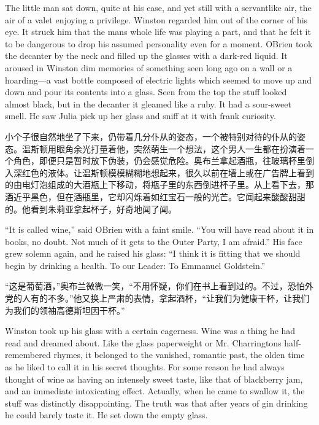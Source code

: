 \begin{paracol}{2}
\switchcolumn*

The little man sat down, quite at his ease, and yet still with a
servantlike air, the air of a valet enjoying a privilege. Winston
regarded him out of the corner of his eye. It struck him that the
man\textquotesingle s whole life was playing a part, and that he felt it
to be dangerous to drop his assumed personality even for a moment.
O\textquotesingle Brien took the decanter by the neck and filled up the
glasses with a dark-red liquid. It aroused in Winston dim memories of
something seen long ago on a wall or a hoarding---a vast bottle composed
of electric lights which seemed to move up and down and pour its
contents into a glass. Seen from the top the stuff looked almost black,
but in the decanter it gleamed like a ruby. It had a sour-sweet smell.
He saw Julia pick up her glass and sniff at it with frank curiosity.

\switchcolumn

小个子很自然地坐了下来，仍带着几分仆从的姿态，一个被特别对待的仆从的姿态。温斯顿用眼角余光打量着他，突然萌生一个想法，这个男人一生都在扮演着一个角色，即便只是暂时放下伪装，仍会感觉危险。奥布兰拿起酒瓶，往玻璃杯里倒入深红色的液体。让温斯顿模模糊糊地想起来，很久以前在墙上或在广告牌上看到的由电灯泡组成的大酒瓶上下移动，将瓶子里的东西倒进杯子里。从上看下去，那酒近乎黑色，但在酒瓶里，它却闪烁着如红宝石一般的光芒。它闻起来酸酸甜甜的。他看到朱莉亚拿起杯子，好奇地闻了闻。

\switchcolumn*

``It is called wine,'' said O\textquotesingle Brien with a faint smile.
``You will have read about it in books, no doubt. Not much of it gets to
the Outer Party, I am afraid.'' His face grew solemn again, and he raised
his glass: ``I think it is fitting that we should begin by drinking a
health. To our Leader: To Emmanuel Goldstein.''

\switchcolumn

``这是葡萄酒，''奥布兰微微一笑，``不用怀疑，你们在书上看到过的。不过，恐怕外党的人有的不多。''他又换上严肃的表情，拿起酒杯，``让我们为健康干杯，让我们为我们的领袖高德斯坦因干杯。''

\switchcolumn*

Winston took up his glass with a certain eagerness. Wine was a thing he
had read and dreamed about. Like the glass paperweight or Mr.
Charrington\textquotesingle s half-remembered rhymes, it belonged to the
vanished, romantic past, the olden time as he liked to call it in his
secret thoughts. For some reason he had always thought of wine as having
an intensely sweet taste, like that of blackberry jam, and an immediate
intoxicating effect. Actually, when he came to swallow it, the stuff was
distinctly disappointing. The truth was that after years of gin drinking
he could barely taste it. He set down the empty glass.


\end{paracol}
